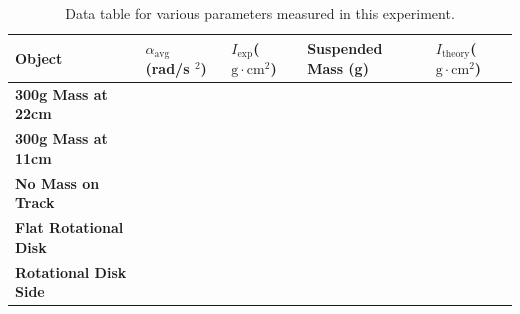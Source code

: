 \begin{center}
\begin{table}
\begin{tabular}{| C{4.5cm} | C{2.6cm} | C{2.6cm} | C{2.6cm} | C{2.6cm} |}
\hline
Object & $\alpha _\text{avg}$ (rad/s $^{2}$) & $I_\text{exp}$($\text{g} \cdot \text{cm} ^{2}$) & Suspended Mass (g) & $I_\text{theory}$($\text{g} \cdot \text{cm}^2$)\\ \hline
 \textbf{300g Mass at 22cm}& & &&\\ \hline
 \textbf{300g Mass at 11cm}& && &\\ \hline
 \textbf{No Mass on Track}& && &\\ \hline
 \textbf{Flat Rotational Disk}& & &&\\ \hline
 \textbf{Rotational Disk Side} & & &&\\ \hline
\end{tabular}
\captionsetup{justification=centering}
\caption{Data table for various parameters measured in this experiment.}
\label{sectab}
\end{table}
\end{center}
